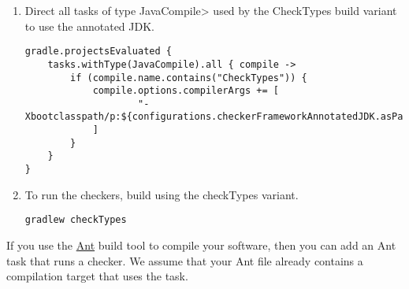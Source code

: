 \begin{enumerate}
\item Direct all tasks of type \<JavaCompile> used by the CheckTypes build variant to use the annotated JDK.
\begin{mysmall}
\begin{Verbatim}
gradle.projectsEvaluated {
    tasks.withType(JavaCompile).all { compile ->
        if (compile.name.contains("CheckTypes")) {
            compile.options.compilerArgs += [
                    "-Xbootclasspath/p:${configurations.checkerFrameworkAnnotatedJDK.asPath}"
            ]
        }
    }
}
\end{Verbatim}
\end{mysmall}

\item To run the checkers, build using the checkTypes variant.
\begin{Verbatim}
gradlew checkTypes
\end{Verbatim}

\end{enumerate}



If you use the \href{http://ant.apache.org/}{Ant} build tool to compile
your software, then you can add an Ant task that runs a checker.  We assume
that your Ant file already contains a compilation target that uses the
 task.

